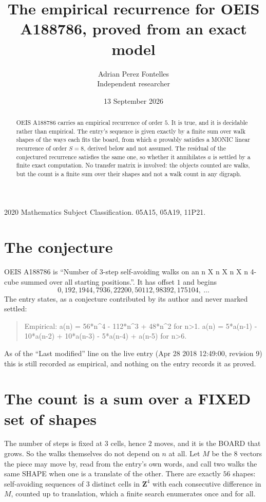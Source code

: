 \documentclass[11pt,a4paper]{article}
\title{The empirical recurrence for OEIS A188786, proved from an exact model}
\author{Adrian Perez Fontelles\\ \small Independent researcher}
\date{13 September 2026}
\theoremstyle{plain}
\theoremstyle{definition}
\begin{document}
\maketitle

\begin{abstract}
OEIS A188786 carries an empirical recurrence of order $5$. It is true, and it is
decidable rather than empirical. The entry's sequence is given exactly by a finite sum over walk shapes of the ways each fits the board, from
which $a$ provably satisfies a MONIC linear recurrence of order $S=8$, derived below and not
assumed. The residual of the conjectured recurrence satisfies the same one, so whether it
annihilates $a$ is settled by a finite exact computation. No transfer matrix is involved: the objects counted are walks, but the count is a finite sum over their shapes and not a walk count in any digraph.
\end{abstract}

\noindent\small 2020 Mathematics Subject Classification. 05A15, 05A19, 11P21.\normalsize

\section{The conjecture}

OEIS A188786 is ``Number of 3-step self-avoiding walks on an n X n X n X n 4-cube summed over all starting positions.''. It has offset $1$ and begins
\[
0, 192, 1944, 7936, 22200, 50112, 98392, 175104,\ \dots
\]
The entry states, as a conjecture contributed by its author and never marked settled:
\begin{quote}
Empirical: a(n) = 56*n\^{}4 - 112*n\^{}3 + 48*n\^{}2 for n>1. a(n) = 5*a(n-1) - 10*a(n-2) + 10*a(n-3) - 5*a(n-4) + a(n-5) for n>6.
\end{quote}
As of the ``Last modified'' line on the live entry (Apr 28 2018 12:49:00, revision 9)
this is still recorded as empirical, and nothing on the entry records it as proved.

\section{The count is a sum over a FIXED set of shapes}

The number of steps is fixed at $3$ cells, hence $2$ moves, and it is the BOARD
that grows. So the walks themselves do not depend on $n$ at all. Let $M$ be the $8$
vectors the piece may move by, read from the entry's own words, and call two walks the same
SHAPE when one is a translate of the other. There are exactly $56$ shapes: self-avoiding
sequences of $3$ distinct cells in $\mathbf{Z}^{4}$ with each consecutive difference in
$M$, counted up to translation, which a finite search enumerates once and for all.
\end{document}
